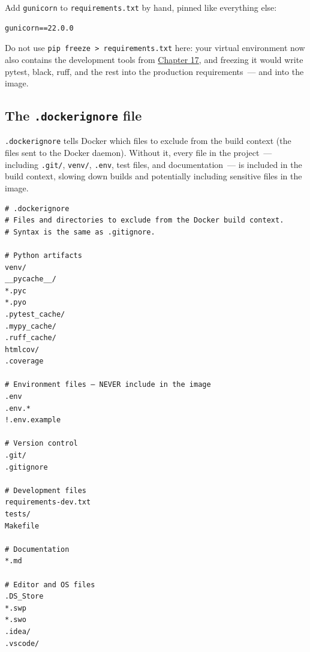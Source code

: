\noindent{}Add \texttt{gunicorn} to \texttt{requirements.txt} by hand, pinned like everything else:

\begin{outputbox}[short]
\begin{Verbatim}[fontsize=\codesize, breaklines, breakanywhere, breaksymbolleft={\tiny\textcolor{muted}{$\hookrightarrow$}}]
gunicorn==22.0.0
\end{Verbatim}
\end{outputbox}

\noindent{}Do not use \texttt{pip\ freeze\ \textgreater{}\ requirements.}\allowbreak{}\texttt{txt} here: your virtual environment now also contains the development tools from \hyperref[ch:17-build-process]{Chapter 17}, and freezing it would write pytest, black, ruff, and the rest into the production requirements~--- and into the image.

\subsection*{\texorpdfstring{The \texttt{.dockerignore} file}{The .dockerignore file}}\label{18-containerization:the-dockerignore-file}

\texttt{.dockerignore} tells Docker which files to exclude from the build context (the files sent to the Docker daemon). Without it, every file in the project~--- including \texttt{.git/}, \texttt{venv/}, \texttt{.env}, test files, and documentation~--- is included in the build context, slowing down builds and potentially including sensitive files in the image.

\begin{outputbox}
\begin{Verbatim}[fontsize=\codesize, breaklines, breakanywhere, breaksymbolleft={\tiny\textcolor{muted}{$\hookrightarrow$}}]
# .dockerignore
# Files and directories to exclude from the Docker build context.
# Syntax is the same as .gitignore.

# Python artifacts
venv/
__pycache__/
*.pyc
*.pyo
.pytest_cache/
.mypy_cache/
.ruff_cache/
htmlcov/
.coverage

# Environment files — NEVER include in the image
.env
.env.*
!.env.example

# Version control
.git/
.gitignore

# Development files
requirements-dev.txt
tests/
Makefile

# Documentation
*.md

# Editor and OS files
.DS_Store
*.swp
*.swo
.idea/
.vscode/
\end{Verbatim}
\end{outputbox}

